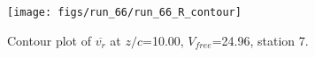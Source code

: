 \begin{figure}[H]
\centering
\texttt{[image: figs/run\_66/run\_66\_R\_contour]}
\caption{Contour plot of $\overline{v_{r}}$ at $z/c$=10.00, $V_{free}$=24.96, station 7.}
\label{fig:run_66_R_contour}
\end{figure}


